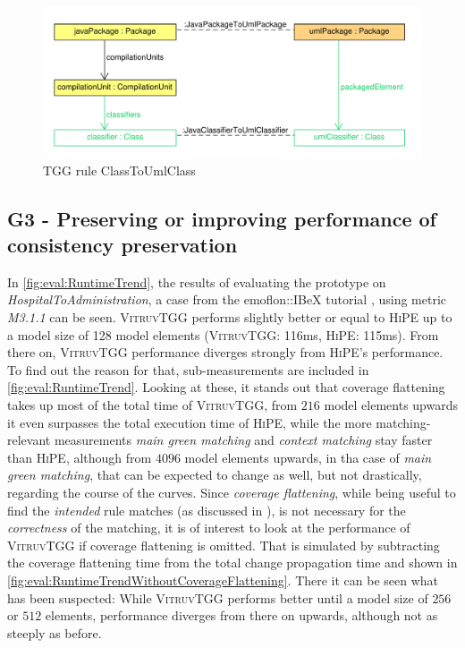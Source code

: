 \begin{figure}
\centering
\includegraphics[width=15.5cm]{figures/tggRule_classToUmlClass.pdf}
\caption{TGG rule ClassToUmlClass}
\label{fig:classToUmlClass}
\end{figure}


\subsection{G3 - Preserving or improving performance of consistency preservation}
\label{sec:Evaluation:Results:G3}
In \autoref{fig:eval:RuntimeTrend}, the results of evaluating the prototype on \emph{HospitalToAdministration}, a case from the emoflon::IBeX tutorial \cite{emoflon_tutorial, noauthor_github_emoflon_tutorial}, using metric \emph{M3.1.1} can be seen. \textsc{VitruvTGG} performs slightly better or equal to \textsc{HiPE} up to a model size of 128 model elements (\textsc{VitruvTGG}: 116ms, \textsc{HiPE}: 115ms). From there on, \textsc{VitruvTGG} performance diverges strongly from \textsc{HiPE}'s performance.
To find out the reason for that, sub-measurements are included in \autoref{fig:eval:RuntimeTrend}. Looking at these, it stands out that coverage flattening takes up most of the total time of \textsc{VitruvTGG}, from $216$  model elements upwards it even surpasses the total execution time of \textsc{HiPE}, while the more matching-relevant measurements \emph{main green matching} and \emph{context matching} stay faster than \textsc{HiPE}, although from $4096$ model elements upwards, in tha case of \emph{main green matching}, that can be expected to change as well, but not drastically, regarding the course of the curves.
Since \emph{coverage flattening}, while being useful to find the \emph{intended} rule matches (as discussed in \cite{khelladi_detecting_complex_changes_2015}), is not necessary for the \emph{correctness} of the matching, it is of interest to look at the performance of \textsc{VitruvTGG} if coverage flattening is omitted. That is simulated by subtracting the coverage flattening time from the total change propagation time and shown in \autoref{fig:eval:RuntimeTrendWithoutCoverageFlattening}.
There it can be seen what has been suspected: While \textsc{VitruvTGG} performs better until a model size of $256$ or $512$ elements, performance diverges from there on upwards, although not as steeply as before.

